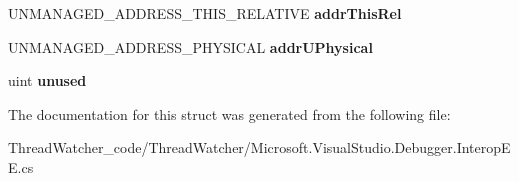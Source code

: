 \begin{DoxyCompactItemize}
\item 
\hypertarget{struct_microsoft_1_1_visual_studio_1_1_debugger_1_1_interop_e_e_1_1_d_e_b_u_g___a_d_d_r_e_s_s___u_n_i_o_n___m_e_m_b_e_r_s_a82552e0ccb2187ff3da3f51c7aeb0d5e}{U\+N\+M\+A\+N\+A\+G\+E\+D\+\_\+\+A\+D\+D\+R\+E\+S\+S\+\_\+\+T\+H\+I\+S\+\_\+\+R\+E\+L\+A\+T\+I\+V\+E {\bfseries addr\+This\+Rel}}\label{struct_microsoft_1_1_visual_studio_1_1_debugger_1_1_interop_e_e_1_1_d_e_b_u_g___a_d_d_r_e_s_s___u_n_i_o_n___m_e_m_b_e_r_s_a82552e0ccb2187ff3da3f51c7aeb0d5e}

\item 
\hypertarget{struct_microsoft_1_1_visual_studio_1_1_debugger_1_1_interop_e_e_1_1_d_e_b_u_g___a_d_d_r_e_s_s___u_n_i_o_n___m_e_m_b_e_r_s_a1dc1e58810bc5f72a5799ecc7ef5559d}{U\+N\+M\+A\+N\+A\+G\+E\+D\+\_\+\+A\+D\+D\+R\+E\+S\+S\+\_\+\+P\+H\+Y\+S\+I\+C\+A\+L {\bfseries addr\+U\+Physical}}\label{struct_microsoft_1_1_visual_studio_1_1_debugger_1_1_interop_e_e_1_1_d_e_b_u_g___a_d_d_r_e_s_s___u_n_i_o_n___m_e_m_b_e_r_s_a1dc1e58810bc5f72a5799ecc7ef5559d}

\item 
\hypertarget{struct_microsoft_1_1_visual_studio_1_1_debugger_1_1_interop_e_e_1_1_d_e_b_u_g___a_d_d_r_e_s_s___u_n_i_o_n___m_e_m_b_e_r_s_afaffdad3b65a037704109f700bbe40f0}{uint {\bfseries unused}}\label{struct_microsoft_1_1_visual_studio_1_1_debugger_1_1_interop_e_e_1_1_d_e_b_u_g___a_d_d_r_e_s_s___u_n_i_o_n___m_e_m_b_e_r_s_afaffdad3b65a037704109f700bbe40f0}

\end{DoxyCompactItemize}


The documentation for this struct was generated from the following file\+:\begin{DoxyCompactItemize}
\item 
Thread\+Watcher\+\_\+code/\+Thread\+Watcher/Microsoft.\+Visual\+Studio.\+Debugger.\+Interop\+E\+E.\+cs\end{DoxyCompactItemize}
